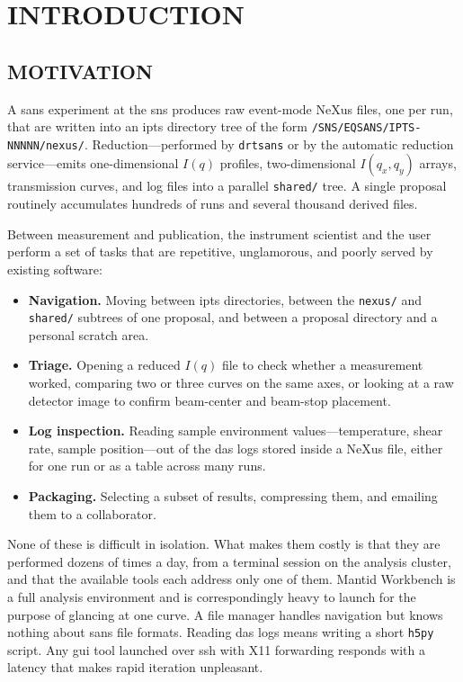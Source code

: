 \documentclass[tm]{ornltm}
\begin{document}
\section{INTRODUCTION}
\label{sec:intro}

\subsection{MOTIVATION}

A \ac{sans} experiment at the \ac{sns} produces raw event-mode NeXus files, one
per run, that are written into an \ac{ipts} directory tree of the form
\texttt{/SNS/EQSANS/IPTS-NNNNN/nexus/}. Reduction---performed by
\texttt{drtsans} \autocite{drtsans} or by the automatic reduction service---emits
one-dimensional $I(q)$ profiles, two-dimensional $I(q_x,q_y)$ arrays,
transmission curves, and log files into a parallel \texttt{shared/} tree. A
single proposal routinely accumulates hundreds of runs and several thousand
derived files.

Between measurement and publication, the instrument scientist and the user
perform a set of tasks that are repetitive, unglamorous, and poorly served by
existing software:

\begin{itemize}
  \item \textbf{Navigation.} Moving between \ac{ipts} directories, between the
    \texttt{nexus/} and \texttt{shared/} subtrees of one proposal, and between a
    proposal directory and a personal scratch area.
  \item \textbf{Triage.} Opening a reduced $I(q)$ file to check whether a
    measurement worked, comparing two or three curves on the same axes, or
    looking at a raw detector image to confirm beam-center and beam-stop
    placement.
  \item \textbf{Log inspection.} Reading sample environment values---temperature,
    shear rate, sample position---out of the \ac{das} logs stored inside a NeXus
    file, either for one run or as a table across many runs.
  \item \textbf{Packaging.} Selecting a subset of results, compressing them, and
    emailing them to a collaborator.
\end{itemize}

None of these is difficult in isolation. What makes them costly is that they are
performed dozens of times a day, from a terminal session on the analysis cluster,
and that the available tools each address only one of them. Mantid Workbench
\autocite{mantid} is a full analysis environment and is correspondingly heavy to
launch for the purpose of glancing at one curve. A file manager handles
navigation but knows nothing about \ac{sans} file formats. Reading \ac{das} logs
means writing a short \texttt{h5py} \autocite{h5py} script. Any \ac{gui} tool
launched over \ac{ssh} with X11 forwarding responds with a latency that makes
rapid iteration unpleasant.
\end{document}
